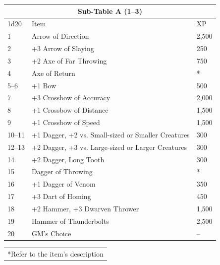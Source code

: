 \begin{multicols}{2}
\begin{minipage}{\columnwidth}
\label{specialweapons}
\noindent \begin{tabular}{|p{}|p{}|p{}|}
\multicolumn{3}{c}{Sub-Table A (1--3)} \\
\hline
1d20	& Item	& XP \\
\hline\hline
\rowcolor[gray]{.9}1	& Arrow of Direction	& 2,500 \\
2	& +3 Arrow of Slaying	& 250 \\
\rowcolor[gray]{.9}3	& +2 Axe of Far Throwing	& 750 \\
4	& Axe of Return	& * \\
\rowcolor[gray]{.9}5--6	& +1 Bow	& 500 \\
7	& +3 Crossbow of Accuracy	& 2,000 \\
\rowcolor[gray]{.9}8	& +1 Crossbow of Distance	& 1,500 \\
9	& +1 Crossbow of Speed	& 1,500 \\
\rowcolor[gray]{.9}10--11	& +1 Dagger, +2 vs. Small-sized or Smaller Creatures	& 300 \\
12--13	& +2 Dagger, +3 vs. Large-sized or Larger Creatures	& 300 \\
\rowcolor[gray]{.9}14	& +2 Dagger, Long Tooth	& 300 \\
15	& Dagger of Throwing	& * \\
\rowcolor[gray]{.9}16	& +1 Dagger of Venom	& 350 \\
17	& +3 Dart of Homing	& 450 \\
\rowcolor[gray]{.9}18	& +2 Hammer, +3 Dwarven Thrower	& 1,500 \\
19	& Hammer of Thunderbolts	& 2,500 \\
\rowcolor[gray]{.9}20	& GM's Choice	& -- \\
\hline
\end{tabular}
\noindent\begin{tabular}{p{}}
*Refer to the item's description \\
\end{tabular}\vspace{.5em}

\end{minipage}


\end{multicols}
